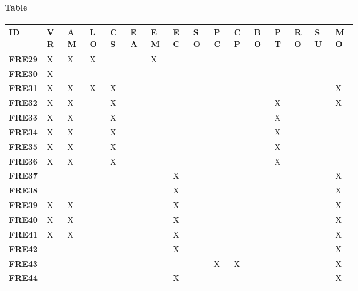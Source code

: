 \paragraph{Table}
\begin{longtable}
{| P{0.085\linewidth} |P{0.04\linewidth} | P{0.044\linewidth} | P{0.04\linewidth} | P{0.04\linewidth} | P{0.04\linewidth} | P{0.04\linewidth} |P{0.04\linewidth} |P{0.04\linewidth} |P{0.04\linewidth} |P{0.04\linewidth} |P{0.04\linewidth} |P{0.04\linewidth} |P{0.04\linewidth} |P{0.04\linewidth} |P{0.04\linewidth} |}
    \hline
    \textbf{ID} & \textbf{VR} & \textbf{AM}& \textbf{LO} & \textbf{CS}  & \textbf{EA} & \textbf{EM} & \textbf{EC} & \textbf{SO} & \textbf{PC} & \textbf{CP} & \textbf{BO} & \textbf{PT} & \textbf{RO} & \textbf{SU }&\textbf{MO}\T\B \\
    \hline 
    \hline
    \textbf{FRE29} & X &X &X & & &X & & & & & & & & &\T\B\\
    \hline
    \textbf{FRE30} & X & & & & & & & & & & & & & &\T\B\\
    \hline
    \textbf{FRE31} & X &X &X&X & & & & & & & & & & &X\T\B\\
    \hline
    \textbf{FRE32} & X &X & &X & & & & & & & &X & & &X\T\B\\
    \hline
    \textbf{FRE33} & X &X & &X & & & & & & & &X & & &\T\B\\
    \hline
    \textbf{FRE34} & X &X & &X & & & & & & & &X & & &\T\B\\
    \hline
    \textbf{FRE35} & X &X & &X & & & & & & & &X & & &\T\B\\
    \hline
    \textbf{FRE36} & X &X & &X & & & & & & & &X & & &\T\B\\
    \hline
    \textbf{FRE37} &  & & & & & &X & & & & & & & &X\T\B\\
    \hline
    \textbf{FRE38} &  & & & & & &X & & & & & & & &X\T\B\\
    \hline
    \textbf{FRE39} &X  &X & & & & &X & & & & & & & &X\T\B\\
    \hline
    \textbf{FRE40} &X  &X & & & & &X & & & & & & & &X\T\B\\
    \hline
    \textbf{FRE41} &X  &X & & & & &X & & & & & & & &X\T\B\\
    \hline
    \textbf{FRE42} &  & & & & & &X & & & & & & & &X\T\B\\
    \hline
    \textbf{FRE43} &  & & & & & & & &X &X & & & & &X\T\B\\
    \hline
    \textbf{FRE44} &  & & & & & &X & & & & & & & &X\T\B\\

\end{longtable}
